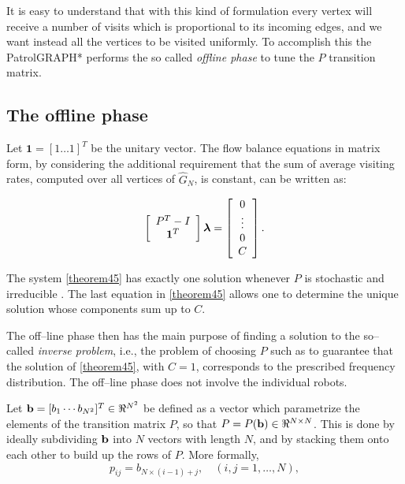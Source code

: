 It is easy to understand that with this kind of formulation every vertex will receive a number of visits which is proportional to its incoming edges, and we want instead all the vertices to be visited uniformly. To accomplish this the PatrolGRAPH* performs the so called \emph{offline phase} to tune the $P$ transition matrix.

\subsection{The offline phase}

Let $\bm{1}=[1 \ldots 1]^T$ be the unitary vector. The flow balance equations in matrix form, by considering the additional requirement that the sum of average visiting rates, computed over all vertices of $\hat{G}_N$, is constant, can be written as:

\begin{equation}
\left[\begin{array}{*{20}c} {P^T - I} \\ {\bm 1^T} \end{array} \right] \bm \lambda = \left[\begin{array}{*{20}c} {0} \\ \vdots \\ {0} \\ {C} \end{array}\right].
\label{theorem45}
\end{equation}

The system \eqref{theorem45} has exactly one solution whenever $P$ is stochastic and irreducible \cite{5711675}. The last equation in \eqref{theorem45} allows one to determine the unique solution whose components sum up to $C$.

The off--line phase then has the main purpose of finding a solution to the so--called \emph{inverse problem}, i.e., the problem of choosing $P$ such as to guarantee that the solution of \eqref{theorem45}, with $C=1$, corresponds to the prescribed frequency distribution. The off--line phase does not involve the individual robots.

Let ${\bf{b}} = [b_{1}\cdots b_{N^2}]^T\in \Re^{N^2}$ be defined as a vector which parametrize the elements of the transition matrix $P$, so that $P=P({\bf{b}})\in\Re^{N\times N}$. This is done by ideally subdividing $\bf{b}$ into $N$ vectors with length $N$, and by stacking them onto each other to build up the rows of $P$. More formally, 
\begin{equation}
p_{ij}=b_{N \times (i - 1) + j}, \quad (i,j=1,\ldots,N),
\label{ths0}
\end{equation}

